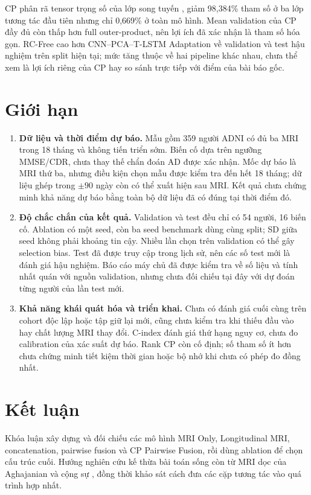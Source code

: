 CP phân rã tensor trọng số của lớp song tuyến \cite{kolda2009tensor}, giảm 98,384\% tham số ở ba lớp tương tác đầu tiên nhưng chỉ 0,669\% ở toàn mô hình. Mean validation của CP đầy đủ còn thấp hơn full outer-product, nên lợi ích đã xác nhận là tham số hóa gọn. RC-Free cao hơn CNN--PCA--T-LSTM Adaptation về validation và test hậu nghiệm trên split hiện tại; mức tăng thuộc về hai pipeline khác nhau, chưa thể xem là lợi ích riêng của CP hay so sánh trực tiếp với điểm của bài báo gốc.

\section{Giới hạn}
\begin{enumerate}
\item \textbf{Dữ liệu và thời điểm dự báo.} Mẫu gồm 359 người ADNI có đủ ba MRI trong 18 tháng và không tiến triển sớm. Biến cố dựa trên ngưỡng MMSE/CDR, chưa thay thế chẩn đoán AD được xác nhận. Mốc dự báo là MRI thứ ba, nhưng điều kiện chọn mẫu được kiểm tra đến hết 18 tháng; dữ liệu ghép trong $\pm90$ ngày còn có thể xuất hiện sau MRI. Kết quả chưa chứng minh khả năng dự báo bằng toàn bộ dữ liệu đã có đúng tại thời điểm đó.
\item \textbf{Độ chắc chắn của kết quả.} Validation và test đều chỉ có 54 người, 16 biến cố. Ablation có một seed, còn ba seed benchmark dùng cùng split; SD giữa seed không phải khoảng tin cậy. Nhiều lần chọn trên validation có thể gây selection bias. Test đã được truy cập trong lịch sử, nên các số test mới là đánh giá hậu nghiệm. Báo cáo máy chủ đã được kiểm tra về số liệu và tính nhất quán với nguồn validation, nhưng chưa đối chiếu tại đây với dự đoán từng người của lần test mới.
\item \textbf{Khả năng khái quát hóa và triển khai.} Chưa có đánh giá cuối cùng trên cohort độc lập hoặc tập giữ lại mới, cũng chưa kiểm tra khi thiếu đầu vào hay chất lượng MRI thay đổi. C-index đánh giá thứ hạng nguy cơ, chưa đo calibration của xác suất dự báo. Rank CP còn cố định; số tham số ít hơn chưa chứng minh tiết kiệm thời gian hoặc bộ nhớ khi chưa có phép đo đồng nhất.
\end{enumerate}

\section{Kết luận}
Khóa luận xây dựng và đối chiếu các mô hình MRI Only, Longitudinal MRI, concatenation, pairwise fusion và CP Pairwise Fusion, rồi dùng ablation để chọn cấu trúc cuối. Hướng nghiên cứu kế thừa bài toán sống còn từ MRI dọc của Aghajanian và cộng sự \cite{aghajanian2025longitudinal}, đồng thời khảo sát cách đưa các cặp tương tác vào quá trình hợp nhất.

